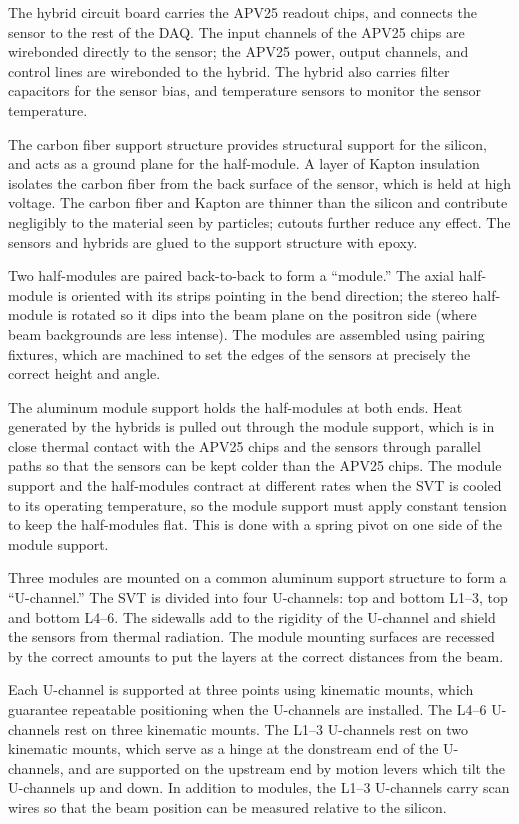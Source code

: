 The hybrid circuit board carries the APV25 readout chips, and connects the sensor to the rest of the DAQ.
The input channels of the APV25 chips are wirebonded directly to the sensor; the APV25 power, output channels, and control lines are wirebonded to the hybrid.
The hybrid also carries filter capacitors for the sensor bias, and temperature sensors to monitor the sensor temperature.

The carbon fiber support structure provides structural support for the silicon, and acts as a ground plane for the half-module.
A layer of Kapton insulation isolates the carbon fiber from the back surface of the sensor, which is held at high voltage.
The carbon fiber and Kapton are thinner than the silicon and contribute negligibly to the material seen by particles; cutouts further reduce any effect.
The sensors and hybrids are glued to the support structure with epoxy.

Two half-modules are paired back-to-back to form a ``module.''
The axial half-module is oriented with its strips pointing in the bend direction; the stereo half-module is rotated so it dips into the beam plane on the positron side (where beam backgrounds are less intense).
The modules are assembled using pairing fixtures, which are machined to set the edges of the sensors at precisely the correct height and angle.

The aluminum module support holds the half-modules at both ends.
Heat generated by the hybrids is pulled out through the module support, which is in close thermal contact with the APV25 chips and the sensors through parallel paths so that the sensors can be kept colder than the APV25 chips.
The module support and the half-modules contract at different rates when the SVT is cooled to its operating temperature, so the module support must apply constant tension to keep the half-modules flat.
This is done with a spring pivot on one side of the module support.

Three modules are mounted on a common aluminum support structure to form a ``U-channel.''
The SVT is divided into four U-channels: top and bottom L1--3, top and bottom L4--6.
The sidewalls add to the rigidity of the U-channel and shield the sensors from thermal radiation.
The module mounting surfaces are recessed by the correct amounts to put the layers at the correct distances from the beam.

Each U-channel is supported at three points using kinematic mounts, which guarantee repeatable positioning when the U-channels are installed.
The L4--6 U-channels rest on three kinematic mounts.
The L1--3 U-channels rest on two kinematic mounts, which serve as a hinge at the donstream end of the U-channels, and are supported on the upstream end by motion levers which tilt the U-channels up and down.
In addition to modules, the L1--3 U-channels carry scan wires so that the beam position can be measured relative to the silicon.


